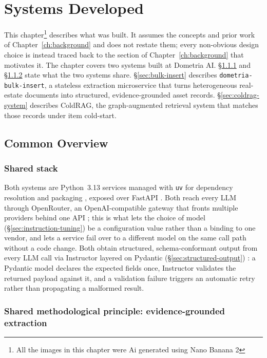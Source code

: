 \chapter{Systems Developed}
\label{ch:systems}

This chapter\footnote{All the images in this chapter were Ai generated using Nano Banana 2} describes what was built. It assumes the concepts and prior work of Chapter~\ref{ch:background} and does not restate them; every non-obvious design choice is instead traced back to the section of Chapter~\ref{ch:background} that motivates it. The chapter covers two systems built at Dometria AI. \S\ref{sec:shared-stack} and \S\ref{sec:evidence-grounded-principle} state what the two systems share. \S\ref{sec:bulk-insert} describes \texttt{dometria-bulk-insert}, a stateless extraction microservice that turns heterogeneous real-estate documents into structured, evidence-grounded asset records. \S\ref{sec:coldrag-system} describes ColdRAG, the graph-augmented retrieval system that matches those records under item cold-start.

\section{Common Overview}
\label{sec:shared-overview}

\subsection{Shared stack}
\label{sec:shared-stack}

Both systems are Python~3.13 services managed with \texttt{uv} for dependency resolution and packaging \citep{astral2026uv}, exposed over FastAPI \citep{ramirez2026fastapi}. Both reach every LLM through OpenRouter, an OpenAI-compatible gateway that fronts multiple providers behind one API \citep{openrouter2026openrouter}; this is what lets the choice of model (\S\ref{sec:instruction-tuning}) be a configuration value rather than a binding to one vendor, and lets a service fail over to a different model on the same call path without a code change. Both obtain structured, schema-conformant output from every LLM call via Instructor layered on Pydantic (\S\ref{sec:structured-output}) \citep{liu2026instructor,colvin2026pydantic}: a Pydantic model declares the expected fields once, Instructor validates the returned payload against it, and a validation failure triggers an automatic retry rather than propagating a malformed result.

\subsection{Shared methodological principle: evidence-grounded extraction}
\label{sec:evidence-grounded-principle}

